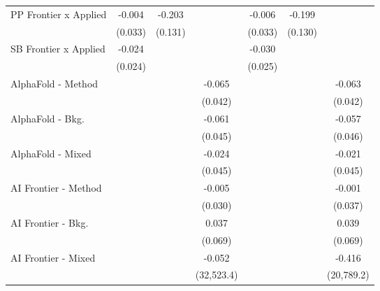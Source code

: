 \begin{tabular}{lcccccc}
   PP Frontier x Applied          & -0.004         & -0.203       &                & -0.006         & -0.199       &   \\   
                                  & (0.033)        & (0.131)      &                & (0.033)        & (0.130)      &   \\   
   SB Frontier x Applied          & -0.024         &              &                & -0.030         &              &   \\   
                                  & (0.024)        &              &                & (0.025)        &              &   \\   
   AlphaFold - Method             &                &              & -0.065         &                &              & -0.063\\   
                                  &                &              & (0.042)        &                &              & (0.042)\\   
   AlphaFold - Bkg.               &                &              & -0.061         &                &              & -0.057\\   
                                  &                &              & (0.045)        &                &              & (0.046)\\   
   AlphaFold - Mixed              &                &              & -0.024         &                &              & -0.021\\   
                                  &                &              & (0.045)        &                &              & (0.045)\\   
   AI Frontier - Method           &                &              & -0.005         &                &              & -0.001\\   
                                  &                &              & (0.030)        &                &              & (0.037)\\   
   AI Frontier - Bkg.             &                &              & 0.037          &                &              & 0.039\\   
                                  &                &              & (0.069)        &                &              & (0.069)\\   
   AI Frontier - Mixed            &                &              & -0.052         &                &              & -0.416\\   
                                  &                &              & (32,523.4)     &                &              & (20,789.2)\\   

\end{tabular}
